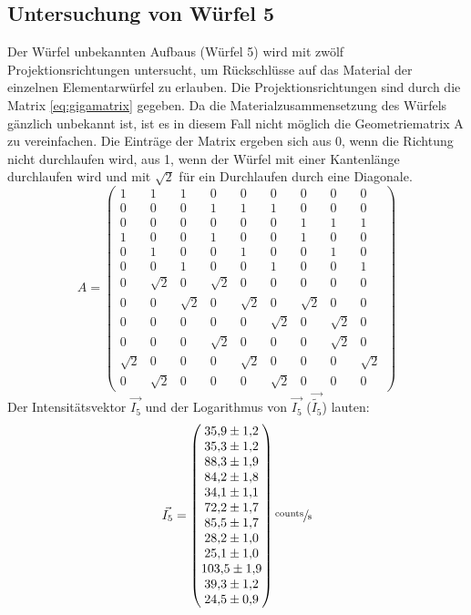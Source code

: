 \subsection{Untersuchung von Würfel 5}
Der Würfel unbekannten Aufbaus (Würfel 5) wird mit zwölf Projektionsrichtungen untersucht, um Rückschlüsse auf das Material der einzelnen Elementarwürfel zu erlauben.
Die Projektionsrichtungen sind durch die Matrix \ref{eq:gigamatrix} gegeben.
Da die Materialzusammensetzung des Würfels gänzlich unbekannt ist, ist es in diesem Fall nicht möglich die Geometriematrix A zu vereinfachen.
Die Einträge der Matrix ergeben sich aus 0, wenn die Richtung nicht durchlaufen wird,
 aus 1, wenn der Würfel mit einer Kantenlänge durchlaufen wird und mit $\sqrt{2}$ für ein Durchlaufen durch eine Diagonale.
\begin{equation}
	A=
	\begin{pmatrix}
    1& 1& 1& 0& 0& 0& 0& 0& 0\\
    0& 0& 0& 1& 1& 1& 0& 0& 0\\
    0 & 0& 0& 0& 0& 0& 1& 1& 1\\
    1& 0& 0& 1& 0& 0& 1& 0& 0\\
    0& 1& 0& 0& 1& 0& 0& 1& 0\\
    0& 0& 1& 0& 0& 1& 0& 0& 1\\
    0& \sqrt{2}& 0& \sqrt{2}& 0& 0& 0& 0& 0\\
    0& 0& \sqrt{2}& 0&\sqrt{2}& 0& \sqrt{2}& 0& 0\\
    0& 0& 0& 0& 0&\sqrt{2}& 0& \sqrt{2}& 0\\
    0& 0& 0&\sqrt{2}& 0& 0& 0&\sqrt{2}& 0\\
    \sqrt{2}& 0& 0& 0& \sqrt{2}& 0& 0& 0& \sqrt{2}\\
    0& \sqrt{2}& 0& 0& 0& \sqrt{2}& 0& 0& 0
	\end{pmatrix}
  \label{eq:gigamatrix}
\end{equation}
Der Intensitätsvektor $\vec{I_5}$ und der Logarithmus von $\vec{I_5}$ ($\vec{\tilde{I_5}}$) lauten:
\begin{equation}
	\vec{I_5}=
	\begin{pmatrix}
		\num{35.9 \pm 1.2} \\
		\num{35.3 \pm 1.2} \\
		\num{88.3\pm 1.9} \\
		\num{84.2\pm 1.8} \\
		\num{34.1\pm 1.1} \\
		\num{72.2\pm 1.7} \\
		\num{85.5\pm 1.7} \\
		\num{28.2\pm 1.0} \\
		\num{25.1\pm 1.0} \\
    \num{103.5\pm 1.9} \\
    \num{39.3\pm 1.2} \\
    \num{24.5\pm 0.9} \\
	\end{pmatrix}
    \sfrac{\text{counts}}{\text{s}}
	\label{eq:vec5}
\end{equation}

